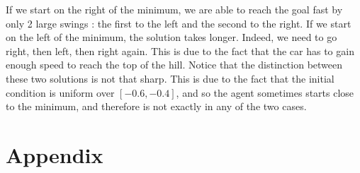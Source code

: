 \documentclass[a4paper, 12pt,oneside]{article}
\begin{document}
        If we start on the right of the minimum, we are able to reach the goal fast by only 2 large swings : the first to the left and the second to the right. If we start on the left of the minimum, the solution takes longer. Indeed, we need to go right, then left, then right again. This is due to the fact that the car has to gain enough speed to reach the top of the hill.
        Notice that the distinction between these two solutions is not that sharp. This is due to the fact that the initial condition is uniform over $[-0.6,-0.4]$, and so the agent sometimes starts close to the minimum, and therefore is not exactly in any of the two cases. 
        \section{Appendix}
\end{document}
